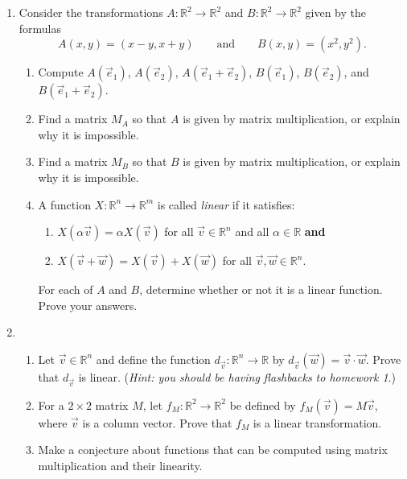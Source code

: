 \documentclass[letter]{article}
\newcommand{\R}{\mathbb{R}}
\begin{document}
\begin{enumerate}
		\item Consider the transformations $A:\R^2\to \R^2$ and $B:\R^2\to \R^2$ given by
			the formulas
			\[
				A(x,y) = (x-y, x+y)\qquad\text{and}\qquad B(x,y)=(x^2,y^2).
			\]
			\begin{enumerate}
				\item Compute $A(\vec e_1)$, $A(\vec e_2)$, $A(\vec e_1+\vec e_2)$,
					$B(\vec e_1)$, $B(\vec e_2)$, and $B(\vec e_1+\vec e_2)$.
				\item Find a matrix $M_A$ so that $A$ is given by matrix
					multiplication, or explain why it is impossible.
				\item Find a matrix $M_B$ so that $B$ is given by matrix
					multiplication, or explain why it is impossible.
				\item A function $X:\R^n\to\R^m$ is called \emph{linear} if it satisfies:
					\begin{enumerate}
						\item $X(\alpha \vec v) = \alpha X(\vec v)$ for all $\vec v\in \R^n$
					and all $\alpha\in \R$ {\bf and} 
						\item $X(\vec v+\vec w) = X(\vec v)
					+X(\vec w)$ for all $\vec v, \vec w\in \R^n$.
					\end{enumerate}

					For each of $A$ and $B$, determine whether or not it is a linear function. Prove your answers.

			\end{enumerate}
		\item \begin{enumerate}
				\item Let $\vec v\in \R^n$ and define the function $d_{\vec v}:\R^n\to\R$ by
					$d_{\vec v}(\vec w) = \vec v\cdot \vec w$.  Prove that $d_{\vec v}$
					is linear.  (\emph{Hint: you should be having flashbacks to homework 1}.)
				\item For a $2\times 2$ matrix $M$, let $f_{M}:\R^2\to\R^2$ be defined by
					$f_M(\vec v) = M\vec v$, where $\vec v$ is a column vector.  Prove that
					$f_M$ is a linear transformation.
				\item Make a conjecture about functions that can be computed using matrix
					multiplication and their linearity.
			\end{enumerate}
	\end{enumerate}
\end{document}
